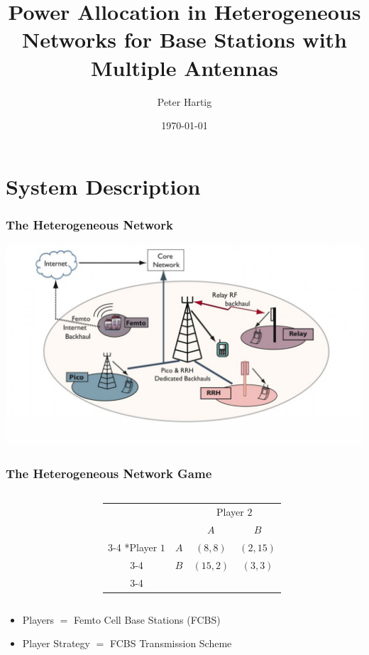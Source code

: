 \documentclass[10pt,tgadventor, onlymath]{beamer}
\title{\large \bfseries Power Allocation in Heterogeneous Networks for Base Stations with Multiple Antennas}
\author{Peter Hartig\\[3ex]
}
\date{\today}
\begin{document}
\frame{
\thispagestyle{empty}
\titlepage
}

\section{System Description}
\begin{frame}
\frametitle{The Heterogeneous Network}
	\includegraphics[width=\textwidth]{het_net}
\end{frame}


\begin{frame}
\frametitle{The Heterogeneous Network Game}
\begin{columns}

\begin{column}{0.5\linewidth}
	

\end{column}
\begin{column}{0.5\linewidth}
\begin{table}
    \setlength{\extrarowheight}{2pt}
    \begin{tabular}{cc|c|c|}
      & \multicolumn{1}{c}{} & \multicolumn{2}{c}{Player $2$}\\
      & \multicolumn{1}{c}{} & \multicolumn{1}{c}{$A$}  & \multicolumn{1}{c}{$B$} \\\cline{3-4}
      \multirow{2}*{Player $1$}  & $A$ & $(8,8)$ & $(2,15)$ \\\cline{3-4}
      & $B$ & $(15,2)$ & $(3,3)$ \\\cline{3-4}
    \end{tabular}
  \end{table}
\end{column}
\end{columns}
\begin{itemize}
\item 
	Players $=$ Femto Cell Base Stations (FCBS)
\item 
	Player Strategy $=$ FCBS Transmission Scheme
\end{itemize}

\end{frame}
\end{document}
